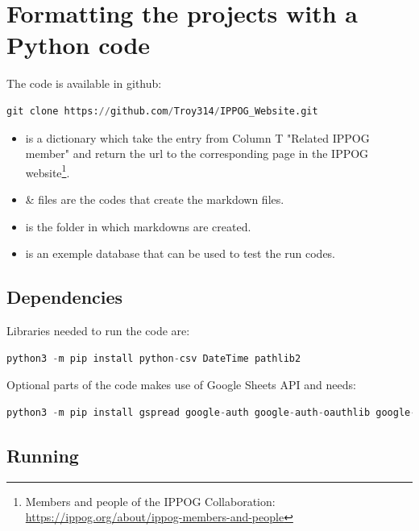 \section{Formatting the projects with a Python code}\label{sec:Python}

The code is available in github: 
\begin{lstlisting}[language=Python]
    git clone https://github.com/Troy314/IPPOG_Website.git
\end{lstlisting}

\begin{itemize}
    \item {} is a dictionary which take the entry from Column T "Related IPPOG member" and return the url to the corresponding page in the IPPOG website\footnote{Members and people of the IPPOG Collaboration: \href{https://ippog.org/about/ippog-members-and-people}{https://ippog.org/about/ippog-members-and-people}}.
    \item {} \&  files are the codes that create the markdown files.
    \item {} is the folder in which markdowns are created.
    \item {} is an exemple database that can be used to test the run codes. 
\end{itemize}

\subsection{Dependencies}\label{dependencies}

Libraries needed to run the code are: 

\begin{lstlisting}[language=Python]
    python3 -m pip install python-csv DateTime pathlib2
\end{lstlisting}

Optional parts of the code makes use of Google Sheets API and needs:

\begin{lstlisting}[language=Python]
    python3 -m pip install gspread google-auth google-auth-oauthlib google-auth-httplib2
\end{lstlisting}

\subsection{Running}

